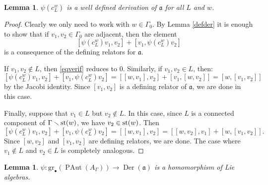 \documentclass[10pt]{amsart}
\newtheorem{lemma}[theorem]{Lemma}
\theoremstyle{definition}
\newcommand{\st}{{\rm st}}
\newcommand{\PAut}{\operatorname{PAut}}
\newcommand{\Der}{\operatorname {Der}}
\newcommand{\al}{\mathfrak{a}}
\newcommand{\gr}{\mathrm{gr}_\bullet}
\theoremstyle{definition}
\numberwithin{equation}{section}
\begin{document}
\begin{lemma}
$\psi(c_L^w)$ is a well defined derivation of $\al$ for all $L$ and $w$.
\end{lemma}

\begin{proof}
Clearly we only need to work with $w \in \Gamma_0$.
By Lemma \ref{defder} it is enough to show that if $v_1, v_2 \in \Gamma_0$ are adjacent, then the element
\begin{equation} \label{eqverif}
[\psi(c_L^w)v_1, v_2] +  [v_1,\psi(c_L^w) v_2]
 \end{equation}
is a consequence of the defining relators for $\al$.

If  $v_1, v_2 \notin L$, then \eqref{eqverif} reduces to $0$. Similarly, if $v_1, v_2 \in L$, then:
\[[\psi(c_L^w)v_1, v_2] +  [v_1,\psi(c_L^w) v_2] = [[w,v_1],v_2]+[v_1,[w,v_2]] = [w,[v_1,v_2]]\]
by the Jacobi identity. Since $[v_1,v_2]$ is a defining relator of $\al$, we are done in this case.

Finally, suppose that $v_1 \in L$ but $v_2 \notin L$. In this case, since $L$ is a connected component of $\Gamma \smallsetminus \st(w)$, we have $v_2 \in \st(w)$. Then
\[[\psi(c_L^w)v_1, v_2] +  [v_1,\psi(c_L^w) v_2] = [[w,v_1],v_2] = [[w,v_2],v_1]+[w,[v_1,v_2]].\]
Since $[w,v_2]$ and $[v_1,v_2]$ are defining relators, we are done. The case where $v_1 \notin L$ and
$v_2 \in L$ is completely analogous.
\end{proof}


\begin{lemma}
 $\psi \colon  \gr(\PAut(A_\Gamma)) \to \Der(\al)$ is a homomorphism of Lie algebras.
\end{lemma}
\end{document}
